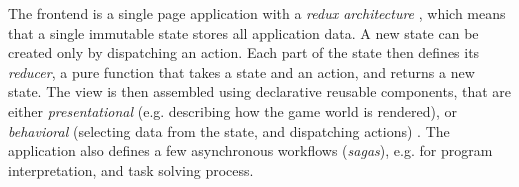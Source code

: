 The frontend is a single page application with a \emph{redux architecture}
\cite[ch.\,12]{flux},
which means that a single immutable state stores all application data.
A new state can be created only by dispatching an action.
Each part of the state then defines its \emph{reducer},
a pure function that takes a state and an action, and returns a new state.
The view is then assembled using declarative reusable
components, that are
either \emph{presentational} (e.g. describing how the game world is
rendered), or \emph{behavioral} (selecting data from the state, %
and dispatching actions) \cite{react}. %
The application also defines a few asynchronous workflows (\emph{sagas}),
e.g. for program interpretation, and task solving process. %
%



